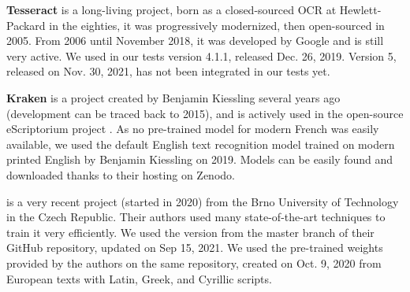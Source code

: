 \textbf{Tesseract} is a long-living project, born as a closed-sourced OCR at Hewlett-Packard in the eighties, it was progressively modernized, then open-sourced in 2005. From 2006 until November 2018, it was developed by Google and is still very active. We used in our tests version 4.1.1, released Dec. 26, 2019. Version 5, released on Nov. 30, 2021, has not been integrated in our tests yet.

\textbf{Kraken} is a project created by Benjamin Kiessling several years ago (development can be traced back to 2015), and is actively used in the open-source eScriptorium project \cite{kiessling_escriptorium_2019}.
As no pre-trained model for modern French was easily available, we used the default English text recognition model trained on modern printed English by Benjamin Kiessling on 2019. Models can be easily found and downloaded thanks to their hosting on Zenodo.

\textbf{\peroocr} is a very recent project (started in 2020) from the Brno University of Technology in the Czech Republic.
Their authors used many state-of-the-art techniques to train it very efficiently.
We used the version from the master branch of their GitHub repository, updated on Sep 15, 2021.
We used the pre-trained weights provided by the authors on the same repository, created on Oct. 9, 2020 from European texts with Latin, Greek, and Cyrillic scripts.


